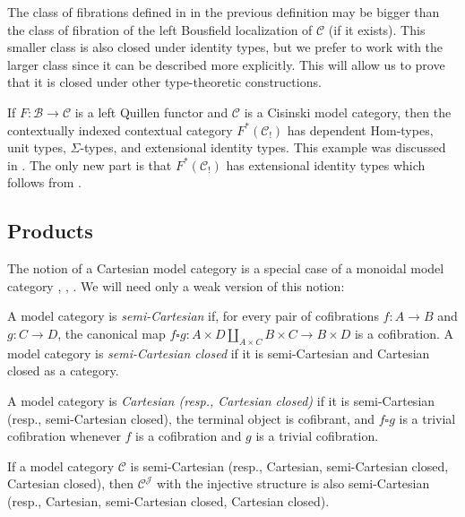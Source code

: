 \documentclass[reqno]{amsart}
\theoremstyle{definition}
\theoremstyle{remark}
\newcommand{\fs}[1]{\mathrm{#1}}
\newcommand{\scat}[1]{\mathcal{#1}}
\newcommand{\Hom}{\fs{Hom}}
\numberwithin{figure}{section}
\begin{document}
\begin{remark}
The class of fibrations defined in in the previous definition may be bigger than the class of fibration of the left Bousfield localization of $\scat{C}$ (if it exists).
This smaller class is also closed under identity types, but we prefer to work with the larger class since it can be described more explicitly.
This will allow us to prove that it is closed under other type-theoretic constructions.
\end{remark}

\begin{example}
If $F : \scat{B} \to \scat{C}$ is a left Quillen functor and $\scat{C}$ is a Cisinski model category, then 
the contextually indexed contextual category $F^*(\scat{C}_!)$ has dependent $\Hom$-types, unit types, $\Sigma$-types, and extensional identity types.
This example was discussed in .
The only new part is that $F^*(\scat{C}_!)$ has extensional identity types which follows from .
\end{example}

\subsection{Products}

The notion of a Cartesian model category is a special case of a monoidal model category \cite[Definition~A.3.1.2]{lurie-topos}, \cite[Definition~4.2.6]{hovey}, \cite[Subsection~2.5]{segal-spaces}.
We will need only a weak version of this notion:

\begin{defn}
A model category is \emph{semi-Cartesian} if, for every pair of cofibrations $f : A \to B$ and $g : C \to D$,
the canonical map $f \square g : A \times D \amalg_{A \times C} B \times C \to B \times D$ is a cofibration.
A model category is \emph{semi-Cartesian closed} if it is semi-Cartesian and Cartesian closed as a category.
\end{defn}

\begin{remark}[cartesian]
A model category is \emph{Cartesian (resp., Cartesian closed)} if it is semi-Cartesian (resp., semi-Cartesian closed), the terminal object is cofibrant, and $f \square g$ is a trivial cofibration whenever $f$ is a cofibration and $g$ is a trivial cofibration.
\end{remark}

\begin{example}
If a model category $\scat{C}$ is semi-Cartesian (resp., Cartesian, semi-Cartesian closed, Cartesian closed), then $\scat{C}^\scat{J}$ with the injective structure is also semi-Cartesian (resp., Cartesian, semi-Cartesian closed, Cartesian closed).
\end{example}
\end{document}
